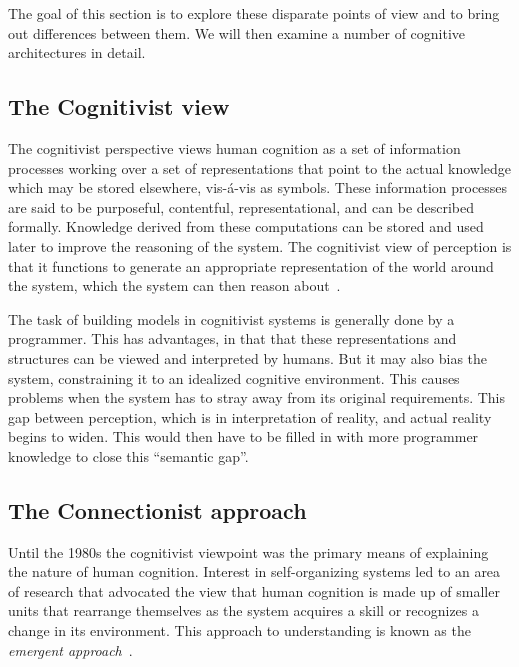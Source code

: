 The goal of this section is to explore these disparate points of view
and to bring out differences between them.  We will then examine a
number of cognitive architectures in detail.

\subsection{The Cognitivist view}
     
The cognitivist perspective views human cognition as a set of
information processes working over a set of representations that point
to the actual knowledge which may be stored elsewhere, vis-\'{a}-vis
as symbols. These information processes are said to be purposeful,
contentful, representational, and can be described
formally\cite{103009}. Knowledge derived from these computations can
be stored and used later to improve the reasoning of the system. The
cognitivist view of perception is that it functions to generate an
appropriate representation of the world around the system, which
the system can then reason about~\cite{DBLP:journals/tec/VernonMS07}.

The task of building models in cognitivist systems is generally done
by a programmer.  This has advantages, in that that these
representations and structures can be viewed and interpreted by
humans. But it may also bias the system, constraining it to an
idealized cognitive environment.  This causes problems when the system
has to stray away from its original requirements.  This gap between
perception, which is in interpretation of reality, and actual reality
begins to widen. This would then have to be filled in with more
programmer knowledge to close this ``semantic
gap''\cite{DBLP:journals/tec/VernonMS07}.
     
\subsection{The Connectionist approach}

     Until the 1980s the cognitivist viewpoint was the primary means
     of explaining the nature of human cognition. Interest in
     self-organizing systems led to an area of research that advocated
     the view that human cognition is made up of smaller units that
     rearrange themselves as the system acquires a skill or recognizes
     a change in its environment. This approach to understanding is
     known as the \emph{emergent approach}~\cite{DBLP:journals/tec/VernonMS07}.
     

